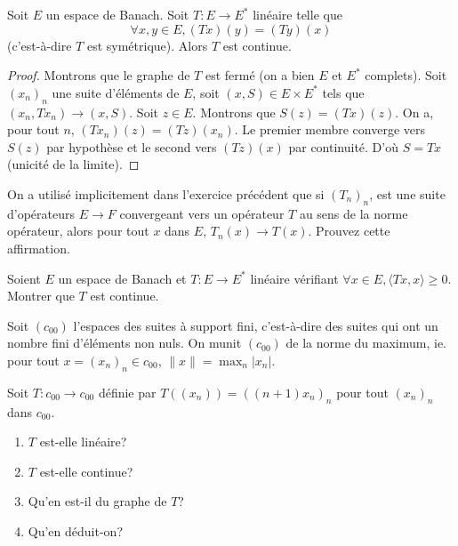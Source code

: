 \begin{prop}
  Soit $E$ un espace de Banach. Soit $T: E\to E^*$ linéaire
  telle que
  $$\forall x, y \in E, (Tx)(y) = (Ty)(x)$$
  (c'est-à-dire $T$ est symétrique). Alors $T$ est continue.
\end{prop}

\begin{proof}
  Montrons que le graphe de $T$ est fermé (on a bien $E$ et $E^*$
  complets). Soit $(x_n)_n$ une suite d'éléments de $E$, soit
  $(x, S)\in E \times E^*$ tels que $(x_n, Tx_n)\to (x, S)$.
  Soit $z\in E$. Montrons que $S(z) = (Tx)(z)$.
  On a, pour tout $n$, $(Tx_n)(z) = (Tz)(x_n)$. Le premier
  membre converge vers $S(z)$ par hypothèse et le second
  vers $(Tz)(x)$ par continuité. D'où $S = Tx$ (unicité
  de la limite).
\end{proof}

\begin{exo}
  On a utilisé implicitement dans l'exercice précédent
  que si $(T_n)_n$, est une suite d'opérateurs $E\to F$ convergeant
  vers un opérateur $T$ au sens de la norme opérateur,
  alors pour tout $x$ dans $E$, $T_n(x) \to T(x)$. Prouvez
  cette affirmation.
\end{exo}

\begin{exo}
  Soient $E$ un espace de Banach et $T: E\to E^*$ linéaire vérifiant
  $\forall x\in E, \langle Tx, x\rangle\geq 0$. Montrer que $T$
  est continue.
\end{exo}


\begin{exo}
  Soit $(c_{00})$ l'espaces des suites à support fini, c'est-à-dire
  des suites qui ont un nombre fini d'éléments non nuls. On munit
  $(c_{00})$ de la norme du maximum, ie. pour tout $x=(x_n)_n\in c_{00}$,
  $\|x\| = \max_{n}|x_n|$.

  Soit $T:c_{00}\to c_{00}$ définie par $T((x_n)) = ((n+1)x_n)_n$
  pour tout $(x_n)_n$ dans $c_{00}$.
  \begin{enumerate}
  \item $T$ est-elle linéaire?
  \item $T$ est-elle continue?
  \item Qu'en est-il du graphe de $T$?
  \item Qu'en déduit-on?
  \end{enumerate}
\end{exo}

